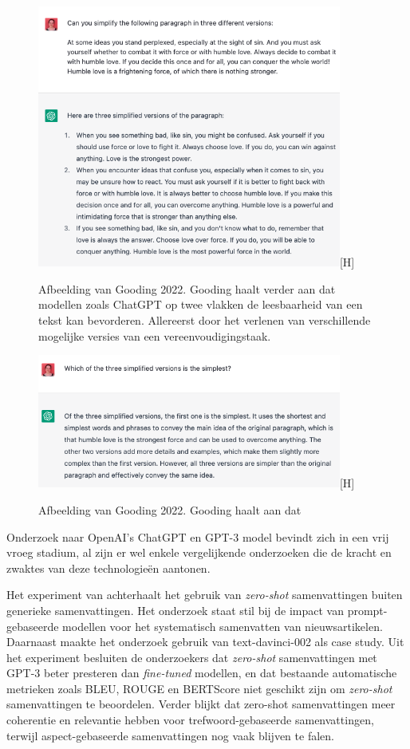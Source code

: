 \begin{figure}
	\includegraphics[width=10cm]{img/chatgpt-example-different-versions-gooding.png}[H]
	\caption{Afbeelding van Gooding 2022. Gooding haalt verder aan dat modellen zoals ChatGPT op twee vlakken de leesbaarheid van een tekst kan bevorderen. Allereerst door het verlenen van verschillende mogelijke versies van een vereenvoudigingstaak.}
\end{figure}

\begin{figure}
	\includegraphics[width=10cm]{img/chatgpt-example-evaluation-gooding.png}[H]
	\caption{Afbeelding van Gooding 2022. Gooding haalt aan dat }
\end{figure}



Onderzoek naar OpenAI's ChatGPT en GPT-3 model bevindt zich in een vrij vroeg stadium, al zijn er wel enkele vergelijkende onderzoeken die de kracht en zwaktes van deze technologieën aantonen.


Het experiment van \textcite{Goyal2022} achterhaalt het gebruik van \textit{zero-shot} samenvattingen buiten generieke samenvattingen. Het onderzoek staat stil bij de impact van prompt-gebaseerde modellen voor het systematisch samenvatten van nieuwsartikelen. Daarnaast maakte het onderzoek gebruik van text-davinci-002 als case study. Uit het experiment besluiten de onderzoekers dat \textit{zero-shot} samenvattingen met GPT-3 beter presteren dan \textit{fine-tuned} modellen, en dat bestaande automatische metrieken zoals BLEU, ROUGE en BERTScore niet geschikt zijn om \textit{zero-shot} samenvattingen te beoordelen. Verder blijkt dat zero-shot samenvattingen meer coherentie en relevantie hebben voor trefwoord-gebaseerde samenvattingen, terwijl aspect-gebaseerde samenvattingen nog vaak blijven te falen.

